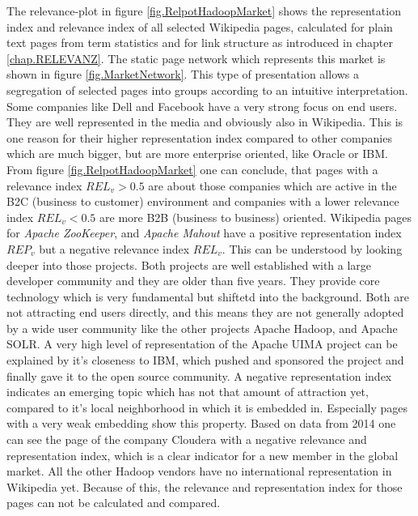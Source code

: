 \documentclass[a4paper,10pt]{scrbook}
\begin{document}
The relevance-plot in figure \ref{fig.RelpotHadoopMarket} shows  the representation index and relevance index of all selected Wikipedia pages, calculated for plain text pages from term statistics and for link structure as introduced in chapter \ref{chap.RELEVANZ}. The
static page network which represents this market is shown in figure \ref{fig.MarketNetwork}. 
This type of presentation allows a segregation of selected pages into groups according to an intuitive interpretation. Some companies like Dell and Facebook have a very strong focus on end users. They are well represented in the media and obviously also in Wikipedia. This is one reason for their higher representation index compared to other companies which are much bigger, but are more enterprise oriented, like Oracle or IBM. From figure \ref{fig.RelpotHadoopMarket} one can conclude, that pages with a relevance index $REL_v > 0.5$ are about those companies which are active in the B2C (business to customer) environment and companies with a lower relevance index $REL_v < 0.5$ are more B2B (business to business) oriented.
Wikipedia pages for \textit{Apache ZooKeeper}, and \textit{Apache Mahout} have a positive representation index $REP_v$ but a negative relevance index $REL_v$. This can be understood by looking deeper into those projects. Both projects are well established with a large developer community and they are older than five years. They provide core technology which is very fundamental but shiftetd into the background. Both are not attracting end users directly, and this means they are not generally adopted by a wide user community like the other projects Apache Hadoop, and Apache SOLR. A very high level of representation of the Apache UIMA project can be explained by it's closeness to IBM, which pushed and sponsored the project and finally gave it to the open source community. 
A negative representation index indicates an emerging topic which has not that amount of attraction yet, compared to it's local neighborhood in which it is embedded in. Especially pages with a very weak embedding show this property. Based on data from 2014 one can see the page of the company Cloudera with a negative relevance and representation index, which is a clear indicator for a new member in the global market. All the other Hadoop vendors have no international representation in Wikipedia yet. Because of this, 
the relevance and representation index for those pages can not be calculated and compared. 

% 
\label{ext.fig.RelpotHadoopMarket} 

\clearpage 
\end{document}
